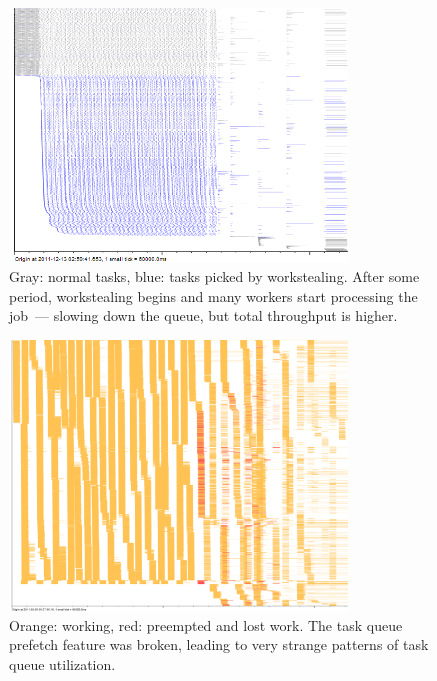 \documentclass{article}
\begin{document}
\begin{figure}[p]
\center
\includegraphics[width=0.8\textwidth]{pics/splot/workstealing.png}
\caption{Gray: normal tasks, blue: tasks picked by workstealing. After some period, workstealing begins and many workers start processing the job~--- slowing down the queue, but total throughput is higher.}
\end{figure}

\begin{figure}[p]
\center
\includegraphics[width=0.8\textwidth]{pics/splot/creepy-prefetch.png}
\caption{Orange: working, red: preempted and lost work. The task queue prefetch feature was broken, leading to very strange patterns of task queue utilization.}
\end{figure}
\end{document}
